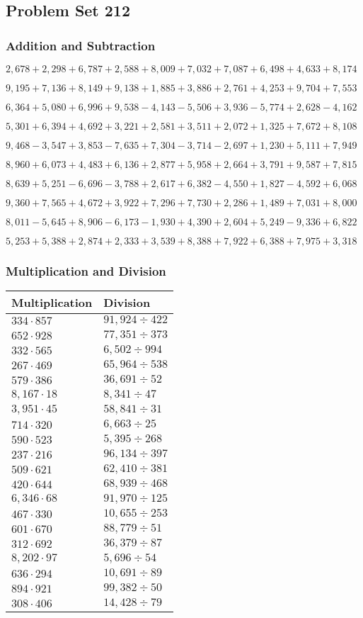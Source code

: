 \hypertarget{problem-set-212}{%
\subsection{Problem Set 212}\label{problem-set-212}}

\hypertarget{addition-and-subtraction}{%
\subsubsection{Addition and
Subtraction}\label{addition-and-subtraction}}

\(2,678+2,298+6,787+2,588+8,009+7,032+7,087+6,498+4,633+8,174\)

\(9,195+7,136+8,149+9,138+1,885+3,886+2,761+4,253+9,704+7,553\)

\(6,364+5,080+6,996+9,538-4,143-5,506+3,936-5,774+2,628-4,162\)

\(5,301+6,394+4,692+3,221+2,581+3,511+2,072+1,325+7,672+8,108\)

\(9,468-3,547+3,853-7,635+7,304-3,714-2,697+1,230+5,111+7,949\)

\(8,960+6,073+4,483+6,136+2,877+5,958+2,664+3,791+9,587+7,815\)

\(8,639+5,251-6,696-3,788+2,617+6,382-4,550+1,827-4,592+6,068\)

\(9,360+7,565+4,672+3,922+7,296+7,730+2,286+1,489+7,031+8,000\)

\(8,011-5,645+8,906-6,173-1,930+4,390+2,604+5,249-9,336+6,822\)

\(5,253+5,388+2,874+2,333+3,539+8,388+7,922+6,388+7,975+3,318\)

\hypertarget{multiplication-and-division}{%
\subsubsection{Multiplication and
Division}\label{multiplication-and-division}}

\begin{longtable}[]{@{}ll@{}}
\toprule
Multiplication & Division\tabularnewline
\midrule
\endhead
\(334\cdot857\) & \(91,924÷422\)\tabularnewline
\(652\cdot928\) & \(77,351÷373\)\tabularnewline
\(332\cdot565\) & \(6,502÷994\)\tabularnewline
\(267\cdot469\) & \(65,964÷538\)\tabularnewline
\(579\cdot386\) & \(36,691÷52\)\tabularnewline
\(8,167\cdot18\) & \(8,341÷47\)\tabularnewline
\(3,951\cdot45\) & \(58,841÷31\)\tabularnewline
\(714\cdot320\) & \(6,663÷25\)\tabularnewline
\(590\cdot523\) & \(5,395÷268\)\tabularnewline
\(237\cdot216\) & \(96,134÷397\)\tabularnewline
\(509\cdot621\) & \(62,410÷381\)\tabularnewline
\(420\cdot644\) & \(68,939÷468\)\tabularnewline
\(6,346\cdot68\) & \(91,970÷125\)\tabularnewline
\(467\cdot330\) & \(10,655÷253\)\tabularnewline
\(601\cdot670\) & \(88,779÷51\)\tabularnewline
\(312\cdot692\) & \(36,379÷87\)\tabularnewline
\(8,202\cdot97\) & \(5,696÷54\)\tabularnewline
\(636\cdot294\) & \(10,691÷89\)\tabularnewline
\(894\cdot921\) & \(99,382÷50\)\tabularnewline
\(308\cdot406\) & \(14,428÷79\)\tabularnewline
\bottomrule
\end{longtable}
